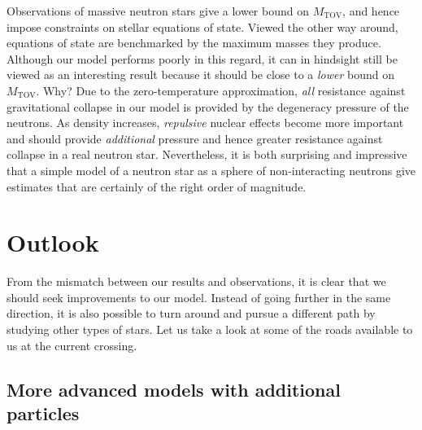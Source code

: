 Observations of massive neutron stars give a lower bound on $M_\text{TOV}$, and hence impose constraints on stellar equations of state.
Viewed the other way around, equations of state are benchmarked by the maximum masses they produce.
Although our model performs poorly in this regard, it can in hindsight still be viewed as an interesting result because it should be close to a \emph{lower} bound on $M_\text{TOV}$.
Why?
Due to the zero-temperature approximation, \emph{all} resistance against gravitational collapse in our model is provided by the degeneracy pressure of the neutrons.
As density increases, \emph{repulsive} nuclear effects become more important and should provide \emph{additional} pressure and hence greater resistance against collapse in a real neutron star. \cite[section 3.9.8]{ref:glendenning}
Nevertheless, it is both surprising and impressive that a simple model of a neutron star as a sphere of non-interacting neutrons give estimates that are certainly of the right order of magnitude.

\section{Outlook}

From the mismatch between our results and observations, it is clear that we should seek improvements to our model.
Instead of going further in the same direction, it is also possible to turn around and pursue a different path by studying other types of stars.
Let us take a look at some of the roads available to us at the current crossing.

\iffalse
\subsection*{Renormalization}

When we encountered infinite vacuum contributions to the energy density and pressure, we simply argued that they were unphysical and ignored them.
A more precise treatment would be to allow for additional self-interactions in the Dirac Lagrangian \eqref{eq:tft:dirac_lagrangian}, hence renormalizing the neutron mass $m$, modifying the equation of state and ultimately the mass-radius curve.
\TODO{is this correct? is the effect small?}
\TODO{is this really significant, or should i just drop it?}
\fi

\subsection*{More advanced models with additional particles}

